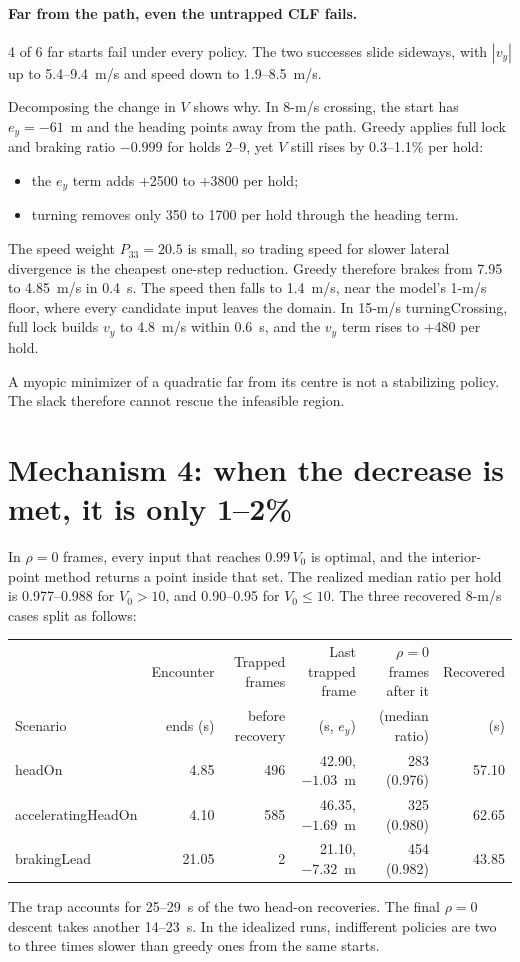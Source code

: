 \documentclass[11pt]{article}
\begin{document}
\paragraph{Far from the path, even the untrapped CLF fails.} 4 of 6 far starts
fail under every policy. The two successes slide sideways, with $|v_y|$ up to
5.4--9.4~m/s and speed down to 1.9--8.5~m/s.

Decomposing the change in $V$ shows why. In 8-m/s crossing, the start has
$e_y=-61$~m and the heading points away from the path. Greedy applies full lock
and braking ratio $-0.999$ for holds 2--9, yet $V$ still rises by 0.3--1.1\% per
hold:
\begin{itemize}
\item the $e_y$ term adds +2500 to +3800 per hold;
\item turning removes only 350 to 1700 per hold through the heading term.
\end{itemize}
The speed weight $P_{33}=20.5$ is small, so trading speed for slower lateral
divergence is the cheapest one-step reduction. Greedy therefore brakes from
7.95 to 4.85~m/s in 0.4~s. The speed then falls to 1.4~m/s, near the model's
1-m/s floor, where every candidate input leaves the domain. In 15-m/s
turningCrossing, full lock builds $v_y$ to 4.8~m/s within 0.6~s, and the
$v_y$ term rises to +480 per hold.

A myopic minimizer of a quadratic far from its centre is not a stabilizing
policy. The slack therefore cannot rescue the infeasible region.

\section{Mechanism 4: when the decrease is met, it is only 1--2\%}\label{sec:rate}
In $\rho=0$ frames, every input that reaches $0.99\,V_0$ is optimal, and the
interior-point method returns a point inside that set. The realized median
ratio per hold is 0.977--0.988 for $V_0>10$, and 0.90--0.95 for $V_0\le10$.
The three recovered 8-m/s cases split as follows:
\begin{center}\footnotesize
\begin{tabular}{lrrrrr}
\toprule
 & Encounter & Trapped frames & Last trapped frame & $\rho=0$ frames after it & Recovered\\
Scenario & ends (s) & before recovery & (s, $e_y$) & (median ratio) & (s)\\
\midrule
headOn & 4.85 & 496 & 42.90, $-1.03$~m & 283 (0.976) & 57.10\\
acceleratingHeadOn & 4.10 & 585 & 46.35, $-1.69$~m & 325 (0.980) & 62.65\\
brakingLead & 21.05 & 2 & 21.10, $-7.32$~m & 454 (0.982) & 43.85\\
\bottomrule
\end{tabular}\end{center}
The trap accounts for 25--29~s of the two head-on recoveries. The final
$\rho=0$ descent takes another 14--23~s. In the idealized runs, indifferent
policies are two to three times slower than greedy ones from the same starts.
\end{document}
